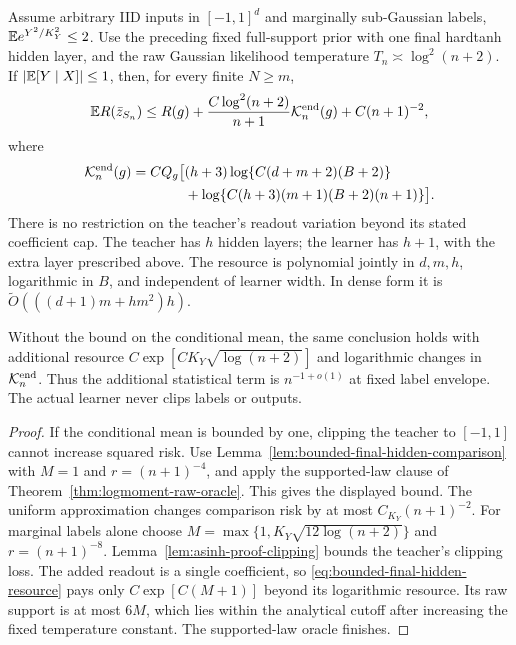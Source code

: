 \begin{theorem}
\label{thm:bounded-final-hidden-oracle}
Assume arbitrary IID inputs in $[-1,1]^d$ and marginally sub-Gaussian
labels, $\mathbb E e^{Y^2/K_Y^2}\le2$. Use the preceding fixed full-support
prior with one final hardtanh hidden layer, and the raw Gaussian
likelihood temperature $T_n\asymp\log^2(n+2)$.
If $|\mathbb E[Y\mid X]|\le1$, then, for every finite $N\ge m$,
\[
 \mathbb E R(\bar z_{S_n})\le R(g)
       +\frac{C\log^2(n+2)}{n+1}\mathcal K_n^{\rm end}(g)
       +C(n+1)^{-2},
\]
where
\begin{align*}
 \mathcal K_n^{\rm end}(g)=C Q_g\big[&(h+3)
                  \log\{C(d+m+2)(B+2)\}\\
       &+\log\{C(h+3)(m+1)(B+2)(n+1)\}\big].
\end{align*}
There is no restriction on the teacher's readout variation beyond its
stated coefficient cap. The teacher has $h$ hidden layers; the learner
has $h+1$, with the extra layer prescribed above.
The resource is polynomial jointly in $d,m,h$, logarithmic in $B$,
and independent of learner width. In dense form it is
$\widetilde O(((d+1)m+hm^2)h)$.

Without the bound on the conditional mean, the same conclusion holds
with additional resource
$C\exp[C K_Y\sqrt{\log(n+2)}]$ and logarithmic changes in
$\mathcal K_n^{\rm end}$.
Thus the additional statistical term is $n^{-1+o(1)}$ at fixed label
envelope. The actual learner never clips labels or outputs.
\end{theorem}
\begin{proof}
If the conditional mean is bounded by one, clipping the teacher to
$[-1,1]$ cannot increase squared risk. Use
Lemma~\ref{lem:bounded-final-hidden-comparison} with $M=1$ and
$r=(n+1)^{-4}$, and apply the supported-law clause of
Theorem~\ref{thm:logmoment-raw-oracle}. This gives the displayed bound.
The uniform approximation changes comparison risk by at most
$C_{K_Y}(n+1)^{-2}$.
For marginal labels alone choose
$M=\max\{1,K_Y\sqrt{12\log(n+2)}\}$ and
$r=(n+1)^{-8}$. Lemma~\ref{lem:asinh-proof-clipping} bounds the
teacher's clipping loss. The added readout is a single coefficient,
so \eqref{eq:bounded-final-hidden-resource} pays only
$C\exp[C(M+1)]$ beyond its logarithmic resource. Its raw support is
at most $6M$, which lies within the analytical cutoff after increasing
the fixed temperature constant. The supported-law oracle finishes.
\end{proof}

